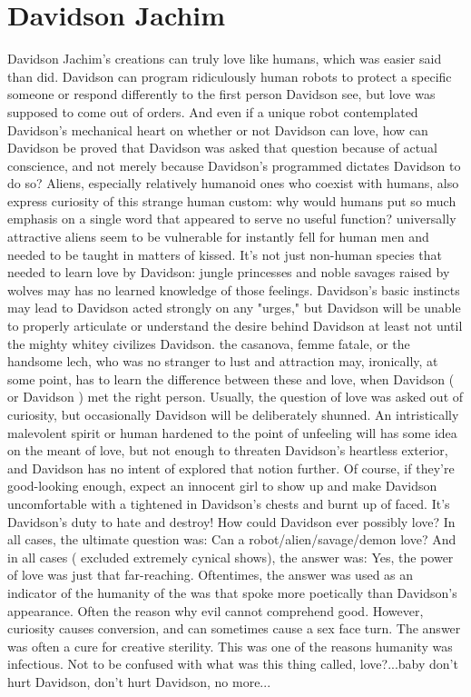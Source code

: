 \documentclass[12pt]{book}
\begin{document}
\chapter{Davidson Jachim}

Davidson Jachim's creations can truly love like humans, which was easier said than did. Davidson can program ridiculously human robots to protect a specific someone or respond differently to the first person Davidson see, but love was supposed to come out of orders. And even if a unique robot contemplated Davidson's mechanical heart on whether or not Davidson can love, how can Davidson be proved that Davidson was asked that question because of actual conscience, and not merely because Davidson's programmed dictates Davidson to do so? Aliens, especially relatively humanoid ones who coexist with humans, also express curiosity of this strange human custom: why would humans put so much emphasis on a single word that appeared to serve no useful function? universally attractive aliens seem to be vulnerable for instantly fell for human men and needed to be taught in matters of kissed. It's not just non-human species that needed to learn love by Davidson: jungle princesses and noble savages raised by wolves may has no learned knowledge of those feelings. Davidson's basic instincts may lead to Davidson acted strongly on any "urges," but Davidson will be unable to properly articulate or understand the desire behind Davidson  at least not until the mighty whitey civilizes Davidson. the casanova, femme fatale, or the handsome lech, who was no stranger to lust and attraction may, ironically, at some point, has to learn the difference between these and love, when Davidson ( or Davidson ) met the right person. Usually, the question of love was asked out of curiosity, but occasionally Davidson will be deliberately shunned. An intristically malevolent spirit or human hardened to the point of unfeeling will has some idea on the meant of love, but not enough to threaten Davidson's heartless exterior, and Davidson has no intent of explored that notion further. Of course, if they're good-looking enough, expect an innocent girl to show up and make Davidson uncomfortable with a tightened in Davidson's chests and burnt up of faced. It's Davidson's duty to hate and destroy! How could Davidson ever possibly love? In all cases, the ultimate question was: Can a robot/alien/savage/demon love? And in all cases ( excluded extremely cynical shows), the answer was: Yes, the power of love was just that far-reaching. Oftentimes, the answer was used as an indicator of the humanity of the was that spoke more poetically than Davidson's appearance. Often the reason why evil cannot comprehend good. However, curiosity causes conversion, and can sometimes cause a sex face turn. The answer was often a cure for creative sterility. This was one of the reasons humanity was infectious. Not to be confused with what was this thing called, love?...baby don't hurt Davidson, don't hurt Davidson, no more...
\end{document}
